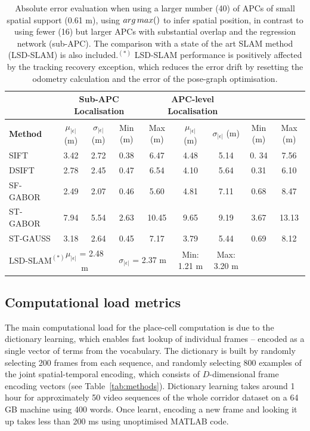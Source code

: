 \begin{table}[h]
\centering
\begin{adjustbox}{max width=\textwidth}

    \begin{tabular}{lcccccccc}
    ~		 & \multicolumn{3}{c}{\textbf{Sub-APC Localisation}} & \multicolumn{3}{c}{\textbf{APC-level Localisation}} \\ \hline
    \textbf{Method}        & $\mu_{|\epsilon|}$ (m) & $\sigma_{|\epsilon|}$ (m) & Min (m) & Max (m) & $\mu_{|\epsilon|}$ (m) & $\sigma_{|\epsilon|}$ (m)  &   Min (m) & Max (m) \\ \hline
    SIFT     & 3.42 & 2.72 & 0.38 & 6.47 & 4.48  & 5.14  & 0. 34 &  7.56\\ \hline
    DSIFT    & 2.78 & 2.45 & 0.47 & 6.54  & 4.10 & 5.64 & 0.31 & 6.10 \\ \hline
    SF-GABOR & 2.49 & 2.07 & 0.46 & 5.60 & 4.81  & 7.11 & 0.68  & 8.47 \\ \hline
    ST-GABOR & 7.94 & 5.54 & 2.63 & 10.45 & 9.65 & 9.19 & 3.67 & 13.13\\ \hline
    ST-GAUSS & 3.18 & 2.64 & 0.45 & 7.17 & 3.79  & 5.44 & 0.69  & 8.12 \\ \hline
    $\text{LSD-SLAM}^{(*)}$ & \multicolumn{2}{c}{$\mu_{|\epsilon|}$ = 2.48 m } & \multicolumn{2}{c}{$\sigma_{|\epsilon|}$ = 2.37 m} & Min: 1.21 m &  Max: 3.20 m \\ \hline
    \end{tabular}
\end{adjustbox}
    \caption {Absolute error evaluation when using a larger number (40) of APCs of small spatial support (0.61 m), using $arg\,max()$ to infer spatial position, in contrast to using fewer (16) but larger APCs with substantial overlap and the regression network (sub-APC). The comparison with a state of the art SLAM method (LSD-SLAM) is also included.$^{(*)}$ LSD-SLAM performance is positively affected by the tracking recovery exception, which reduces the error drift by resetting the odometry calculation and the error of the pose-graph optimisation.}
    \label{table:methodComparison}
\end{table}


\subsection{Computational load metrics}
The main computational load for the place-cell computation is due to the dictionary learning, which enables fast lookup of individual frames -- encoded as a single vector of terms from the vocabulary.  The dictionary is built by randomly selecting 200 frames from each sequence, and randomly selecting 800 examples of the joint spatial-temporal encoding, which consists of $D$-dimensional frame encoding vectors (see Table~\ref{tab:methods}). Dictionary learning takes around 1 hour for approximately 50 video sequences of the whole corridor dataset on a 64 GB machine using 400 words. Once learnt, encoding a new frame and looking it up takes less than 200 ms using unoptimised MATLAB code. 

